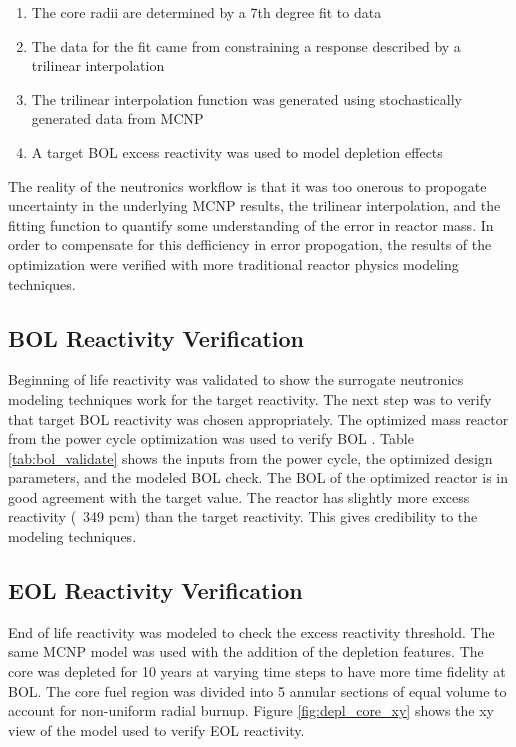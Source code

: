 \onehalfspacing
\begin{enumerate}
    \item The core radii are determined by a 7th degree fit to data
    \item The data for the fit came from constraining a \keff response described
        by a trilinear interpolation
    \item The trilinear interpolation function was generated using stochastically
        generated \keff data from MCNP
    \item A target BOL excess reactivity was used to model depletion effects
\end{enumerate}
\doublespacing

The reality of the neutronics workflow is that it was too onerous to propogate
uncertainty in the underlying MCNP results, the trilinear interpolation, and the
fitting function to quantify some understanding of the error in reactor mass. In
order to compensate for this defficiency in error propogation, the results of
the optimization were verified with more traditional reactor physics modeling
techniques.

\subsection{BOL Reactivity Verification}
Beginning of life reactivity was validated to show the surrogate neutronics
modeling techniques work for the target reactivity. The next step was to verify
that target BOL reactivity was chosen appropriately. The optimized mass reactor
from the power cycle optimization was used to verify BOL \keff. Table
\ref{tab:bol_validate} shows the inputs from the power cycle, the optimized
design parameters, and the modeled BOL \keff check. The BOL \keff of the optimized reactor
is in good agreement with the target value. 
The reactor has slightly more excess reactivity (~349 pcm) than the
target reactivity. This gives credibility to the \keff modeling techniques.

\subsection{EOL Reactivity Verification}
End of life reactivity was modeled to check the excess reactivity threshold. The
same MCNP model was used with the addition of the depletion features. The core
was depleted for 10 years at varying time steps to have more time fidelity at
BOL. The core fuel region was divided into 5 annular sections of equal volume to
account for non-uniform radial burnup. Figure \ref{fig:depl_core_xy} shows the
xy view of the model used to verify EOL reactivity.

